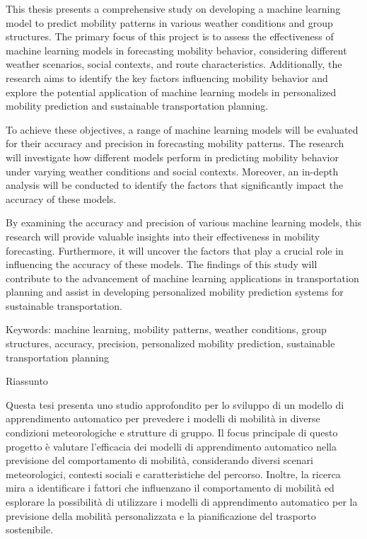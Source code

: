 %
\label{sec:abstract}

This thesis presents a comprehensive study on developing a machine learning model to predict mobility patterns in various weather conditions and group structures. The primary focus of this project is to assess the effectiveness of machine learning models in forecasting mobility behavior, considering different weather scenarios, social contexts, and route characteristics. Additionally, the research aims to identify the key factors influencing mobility behavior and explore the potential application of machine learning models in personalized mobility prediction and sustainable transportation planning.

To achieve these objectives, a range of machine learning models will be evaluated for their accuracy and precision in forecasting mobility patterns. The research will investigate how different models perform in predicting mobility behavior under varying weather conditions and social contexts. Moreover, an in-depth analysis will be conducted to identify the factors that significantly impact the accuracy of these models.

By examining the accuracy and precision of various machine learning models, this research will provide valuable insights into their effectiveness in mobility forecasting. Furthermore, it will uncover the factors that play a crucial role in influencing the accuracy of these models. The findings of this study will contribute to the advancement of machine learning applications in transportation planning and assist in developing personalized mobility prediction systems for sustainable transportation.

Keywords: machine learning, mobility patterns, weather conditions, group structures, accuracy, precision, personalized mobility prediction, sustainable transportation planning

\newpage

{Riassunto}
\label{sec:abstract-diff}

Questa tesi presenta uno studio approfondito per lo sviluppo di un modello di apprendimento automatico per prevedere i modelli di mobilità in diverse condizioni meteorologiche e strutture di gruppo. Il focus principale di questo progetto è valutare l'efficacia dei modelli di apprendimento automatico nella previsione del comportamento di mobilità, considerando diversi scenari meteorologici, contesti sociali e caratteristiche del percorso. Inoltre, la ricerca mira a identificare i fattori che influenzano il comportamento di mobilità ed esplorare la possibilità di utilizzare i modelli di apprendimento automatico per la previsione della mobilità personalizzata e la pianificazione del trasporto sostenibile.


